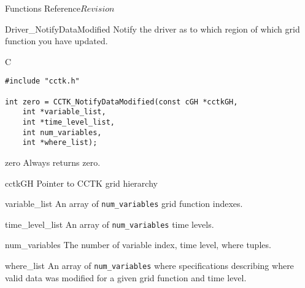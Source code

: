 \begin{cactuspart}{ Functions Reference}{}{$Revision$}
\begin{FunctionDescription}{Driver\_NotifyDataModified}
\label{Driver-NotifyDataModified}
Notify the driver as to which region of which grid function you have updated.
\begin{SynopsisSection}
\begin{Synopsis}{C}
\begin{verbatim}
#include "cctk.h"

int zero = CCTK_NotifyDataModified(const cGH *cctkGH,
    int *variable_list,
    int *time_level_list,
    int num_variables,
    int *where_list);

\end{verbatim}
\end{Synopsis}
\end{SynopsisSection}

\begin{ResultSection}
\begin{Result}{zero}
Always returns zero.
\end{Result}
\end{ResultSection}

\begin{ParameterSection}
\begin{Parameter}{cctkGH}
Pointer to CCTK grid hierarchy
\end{Parameter}
\end{ParameterSection}

\begin{ParameterSection}
\begin{Parameter}{variable\_list}
An array of \texttt{num\_variables} grid function indexes.
\end{Parameter}
\end{ParameterSection}

\begin{ParameterSection}
\begin{Parameter}{time\_level\_list}
An array of \texttt{num\_variables} time levels.
\end{Parameter}
\end{ParameterSection}

\begin{ParameterSection}
\begin{Parameter}{num\_variables}
The number of variable index, time level, where tuples.
\end{Parameter}
\end{ParameterSection}

\begin{ParameterSection}
\begin{Parameter}{where\_list}
An array of \texttt{num\_variables} where specifications describing
where valid data was modified for a given grid function and time level.
\end{Parameter}
\end{ParameterSection}


\end{FunctionDescription}
\end{cactuspart}
